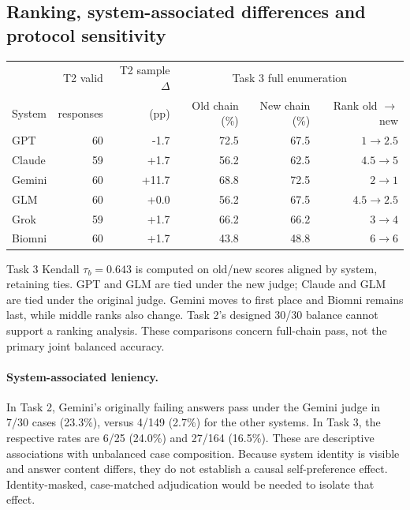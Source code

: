 \subsection*{Ranking, system-associated differences and protocol sensitivity}
\begin{center}
\begin{tabular}{lrrrrr}
\toprule
 & T2 valid & T2 sample $\Delta$ & \multicolumn{3}{c}{Task 3 full enumeration} \\
System & responses & (pp) & Old chain (\%) & New chain (\%) & Rank old $\to$ new \\
\midrule
GPT & 60 & -1.7 & 72.5 & 67.5 & $1\to 2.5$ \\
Claude & 59 & +1.7 & 56.2 & 62.5 & $4.5\to 5$ \\
Gemini & 60 & +11.7 & 68.8 & 72.5 & $2\to 1$ \\
GLM & 60 & +0.0 & 56.2 & 67.5 & $4.5\to 2.5$ \\
Grok & 59 & +1.7 & 66.2 & 66.2 & $3\to 4$ \\
Biomni & 60 & +1.7 & 43.8 & 48.8 & $6\to 6$ \\
\bottomrule
\end{tabular}
\end{center}
Task 3 Kendall $\tau_b=0.643$ is computed on old/new scores aligned by system, retaining ties. GPT and GLM are tied under the new judge; Claude and GLM are tied under the original judge. Gemini moves to first place and Biomni remains last, while middle ranks also change. Task 2's designed 30/30 balance cannot support a ranking analysis. These comparisons concern full-chain pass, not the primary joint balanced accuracy.

\paragraph{System-associated leniency.} In Task 2, Gemini's originally failing answers pass under the Gemini judge in 7/30 cases (23.3\%), versus 4/149 (2.7\%) for the other systems. In Task 3, the respective rates are 6/25 (24.0\%) and 27/164 (16.5\%). These are descriptive associations with unbalanced case composition. Because system identity is visible and answer content differs, they do not establish a causal self-preference effect. Identity-masked, case-matched adjudication would be needed to isolate that effect.

